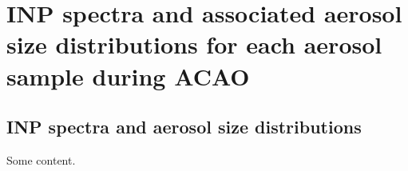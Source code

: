 \chapter{INP spectra and associated aerosol size distributions for each aerosol sample during ACAO}
\section{INP spectra and aerosol size distributions}
Some content.